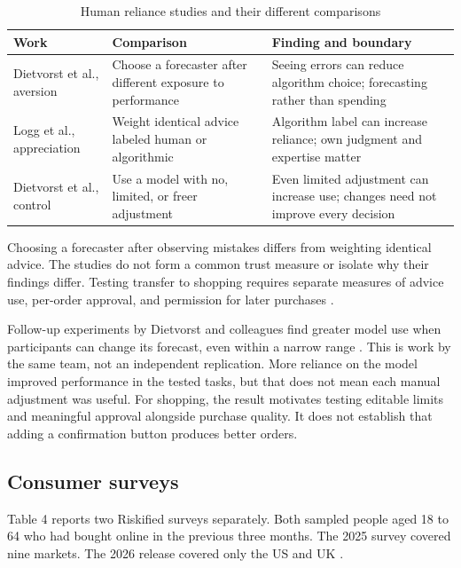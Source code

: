 \documentclass{article}
\begin{document}
\begin{table}[H]
\centering
\caption{Human reliance studies and their different comparisons}
\footnotesize
\begin{tabularx}{\textwidth}{@{}>{\raggedright\arraybackslash}X>{\raggedright\arraybackslash}X>{\raggedright\arraybackslash}X@{}}
\toprule
\textbf{Work} & \textbf{Comparison} & \textbf{Finding and boundary} \\
\midrule
Dietvorst et al., aversion \cite{ref29} & Choose a forecaster after different exposure to performance & Seeing errors can reduce algorithm choice; forecasting rather than spending \\[3pt]
Logg et al., appreciation \cite{ref30} & Weight identical advice labeled human or algorithmic & Algorithm label can increase reliance; own judgment and expertise matter \\[3pt]
Dietvorst et al., control \cite{ref31} & Use a model with no, limited, or freer adjustment & Even limited adjustment can increase use; changes need not improve every decision \\[3pt]
\bottomrule
\end{tabularx}
\end{table}

Choosing a forecaster after observing mistakes differs from weighting identical advice. The studies do not form a common trust measure or isolate why their findings differ. Testing transfer to shopping requires separate measures of advice use, per-order approval, and permission for later purchases \cite{ref29,ref30}.

Follow-up experiments by Dietvorst and colleagues find greater model use when participants can change its forecast, even within a narrow range \cite{ref31}. This is work by the same team, not an independent replication. More reliance on the model improved performance in the tested tasks, but that does not mean each manual adjustment was useful. For shopping, the result motivates testing editable limits and meaningful approval alongside purchase quality. It does not establish that adding a confirmation button produces better orders.

\subsection{Consumer surveys}

Table 4 reports two Riskified surveys separately. Both sampled people aged 18 to 64 who had bought online in the previous three months. The 2025 survey covered nine markets. The 2026 release covered only the US and UK \cite{ref15,ref16}.
\end{document}
